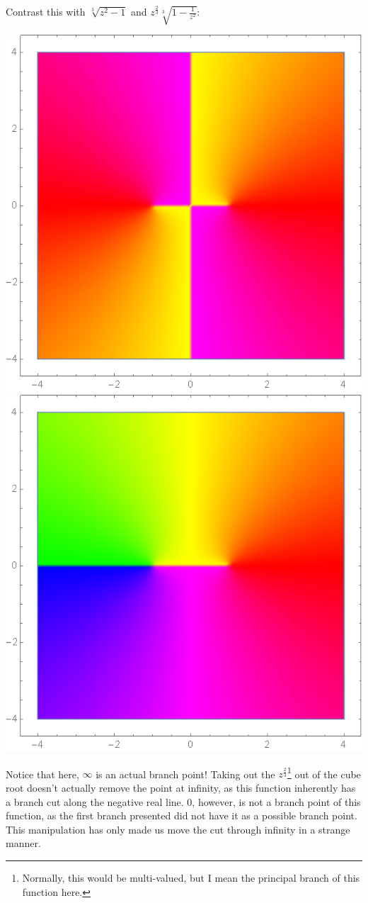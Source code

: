 \documentclass[12pt]{scrartcl}
\begin{document}
Contrast this with $\sqrt[3]{z^2-1}$ and $z^{\frac{2}{3}} \sqrt[3]{1-\frac{1}{z^2}}$:
\begin{center}
	\includegraphics[scale=0.27]{images/cbrtzsqrminus1.png}
	\includegraphics[scale=0.27]{images/cbrtzsqrminus2.png}
\end{center}
Notice that here, $\infty$ is an actual branch point! Taking out the $z^{\frac{2}{3}}$\footnote{Normally, this would be multi-valued, but I mean the principal branch of this function here. } out of the cube root doesn't actually remove the point at infinity, as this function inherently has a branch cut along the negative real line. $0$, however, is not a branch point of this function, as the first branch presented did not have it as a possible branch point. This manipulation has only made us move the cut through infinity in a strange manner.
\end{document}
